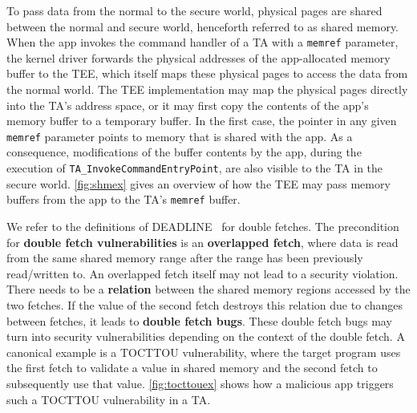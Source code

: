 \documentclass[conference]{IEEEtran}
\begin{document}
To pass data from the normal to the secure world, physical pages are shared 
between the normal and secure world, henceforth referred to as shared memory. 
When the app invokes the command handler of a TA with a \texttt{memref} 
parameter, the kernel driver forwards the physical addresses of the app-allocated 
memory buffer to the TEE, which itself maps these physical pages to access the data 
from the normal world. The TEE implementation may map 
the physical pages directly into the TA's address space, or it may first copy
the contents of the app's memory buffer to a temporary buffer. In the first case, the 
pointer in any given \texttt{memref} parameter points to memory that is shared 
with the app. As a consequence, modifications of the buffer contents by the app, 
during the execution of \texttt{TA\_InvokeCommandEntryPoint}, are also visible to the 
TA in the secure world. \autoref{fig:shmex} gives an overview of how the TEE may pass 
memory buffers from the app to the TA's \texttt{memref} buffer.

\begin{listing}[h]
    \label{lst:exdf}
\end{listing}

We refer to the definitions of \textsc{DEADLINE}~\cite{deadline} for double fetches.
The precondition for \textbf{double fetch vulnerabilities} is an \textbf{overlapped fetch}, where data 
is read from the same shared memory range after the range has been previously read/written to. 
An overlapped fetch itself may not lead to a security violation. There needs to be a \textbf{relation}
between the shared memory regions accessed by the two fetches. If the value of the second fetch 
destroys this relation due to changes between fetches, it leads to \textbf{double fetch bugs}.  
These double fetch bugs may turn into security vulnerabilities depending on the context of the 
double fetch. A canonical example is a TOCTTOU vulnerability, where the target program uses the 
first fetch to validate a value in shared memory and the second fetch to subsequently use that value. 
\autoref{fig:tocttouex} shows how a malicious app triggers such a TOCTTOU vulnerability in a TA. 
\end{document}
